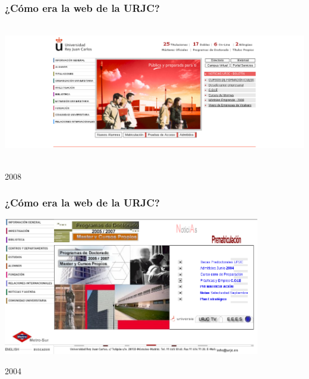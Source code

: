 \begin{frame}
\frametitle{¿Cómo era la web de la URJC?}

\includegraphics[height=6cm]{figs/web-urjc-2008}

{\Large
\begin{flushright}
2008
\end{flushright}
}
\end{frame}

\begin{frame}
\frametitle{¿Cómo era la web de la URJC?}

\includegraphics[height=6cm]{figs/web-urjc-2004}

{\Large
\begin{flushright}
2004
\end{flushright}
}
\end{frame}

